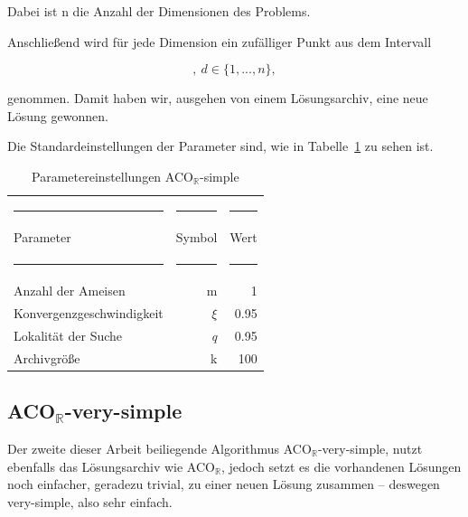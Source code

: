 \documentclass[fontsize=12, a4aper]{scrartcl}
\begin{document}
	\noindent Dabei ist n die Anzahl der Dimensionen des Problems.\hfill\newline
	
	\noindent Anschließend wird für jede Dimension ein zufälliger Punkt aus dem Intervall
	
	\begin{equation}
	[s_d - \delta_d, s_d + \delta_d], ~ d \in \{1, ..., n\},
	\end{equation}
	
	\noindent genommen. Damit haben wir, ausgehen von einem Lösungsarchiv, eine neue Lösung gewonnen. \hfill\newline
	
	\noindent Die Standardeinstellungen der Parameter sind, wie in Tabelle~\ref{ACO_R_simple_Parametereinstellungen} zu sehen ist.
	
	\begin{table}[H]
		\fontsize{10pt}{12pt}
		
		\caption{Parametereinstellungen ACO\(_{\mathbb{R}}\)-simple}
		\label{ACO_R_simple_Parametereinstellungen}
		
		\begin{tabularx}{\textwidth}{l|r|r}
			
			\rule{4.6cm}{0.4pt} & \rule{4.6cm}{0.4pt}& \rule{4.6cm}{0.4pt}\\
			
			Parameter & Symbol & Wert\\
			
			\rule{4.6cm}{0.4pt} & \rule{4.6cm}{0.4pt}& \rule{4.6cm}{0.4pt}\\
			
			Anzahl der Ameisen & m & 1\\
			Konvergenzgeschwindigkeit & \(\xi\) & 0.95\\
			Lokalität der Suche & \textit{q} & 0.95\\
			Archivgröße & k & 100
			
			
		\end{tabularx}
		
	\end{table}

	\subsection{ACO\(_{\mathbb{R}}\)-very-simple} \label{ACO_R_very_simple}
	
	Der zweite dieser Arbeit beiliegende Algorithmus ACO\(_{\mathbb{R}}\)-very-simple, nutzt ebenfalls das Lösungsarchiv wie ACO\(_{\mathbb{R}}\), jedoch setzt es die vorhandenen Lösungen noch einfacher, geradezu trivial, zu einer neuen Lösung zusammen -- deswegen very-simple, also sehr einfach.\hfill\newline
	
\end{document}
